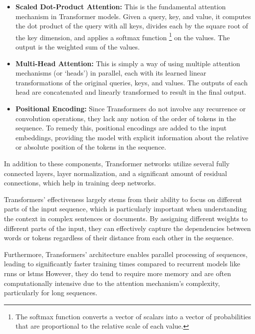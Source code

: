 \begin{itemize}
    \item \textbf{Scaled Dot-Product Attention:} This is the fundamental attention
          mechanism in Transformer models. Given a query, key, and value, it computes
          the dot product of the query with all keys, divides each by the square root
          of the key dimension, and applies a softmax function
          \footnote{The softmax function converts a vector of scalars into a
              vector of probabilities that are proportional to the relative scale
              of each value.} on the values.
          The output is the weighted sum of the values.

    \item \textbf{Multi-Head Attention:} This is simply a way of using multiple
          attention mechanisms (or `heads') in parallel, each with its learned linear
          transformations of the original queries, keys, and values. The outputs of
          each head are concatenated and linearly transformed to result in the final output.

    \item \textbf{Positional Encoding:} Since Transformers do not involve any
          recurrence or convolution operations, they lack any notion of the order of
          tokens in the sequence. To remedy this, positional encodings are added to
          the input embeddings, providing the model with explicit information about
          the relative or absolute position of the tokens in the sequence.
\end{itemize}

In addition to these components, Transformer networks utilize several fully
connected layers, layer normalization, and a significant amount of residual
connections, which help in training deep networks.

Transformers' effectiveness largely stems from their ability to focus on
different parts of the input sequence, which is particularly important when
understanding the context in complex sentences or documents. By assigning
different weights to different parts of the input, they can effectively capture
the dependencies between words or tokens regardless of their distance from each
other in the sequence.

Furthermore, Transformers' architecture enables parallel processing of
sequences, leading to significantly faster training times compared to recurrent
models like \glspl{rnn} or \glspl{lstm} However, they do tend to require more
memory and are often computationally intensive due to the attention mechanism's
complexity, particularly for long sequences.

